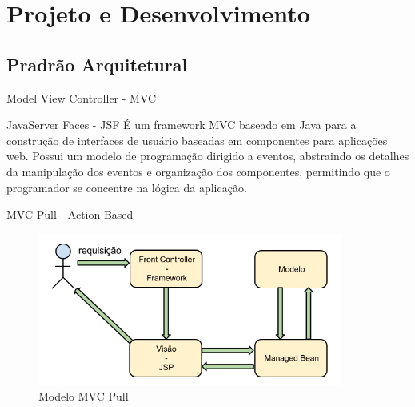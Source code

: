 \documentclass[xcolor=dvipsnames]{beamer}
\begin{document}
\section{Projeto e Desenvolvimento}
   \subsection{Pradrão Arquitetural}
	\begin{frame}{Model View Controller - MVC}
		\begin{block}{JavaServer Faces - JSF}	
É um framework MVC baseado em Java para a construção de interfaces de usuário baseadas em componentes para aplicações web. Possui um modelo de programação dirigido a eventos, abstraindo os detalhes da manipulação dos eventos e organização dos componentes, permitindo que o programador se concentre na lógica da aplicação.	
		\end{block}
	\end{frame}

	\begin{frame}{MVC Pull - Action Based}
		\begin{figure}[!htb]
			\centering
			\includegraphics[keepaspectratio=true,height=5cm]{mvc-pull.png}
			\caption{Modelo MVC Pull}
			\label{rec-ER}
		\end{figure}				

	\end{frame}	

\end{document}
